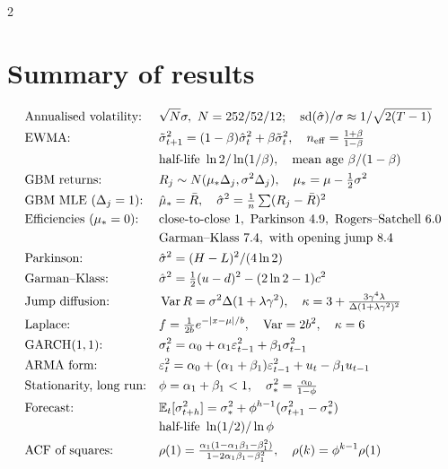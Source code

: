 \begin{paracol}{2}
\section*{Summary of results}
\begin{keyformulas}
\begin{align*}
&\text{Annualised volatility:} && \sqrt N\sigma,\ N=252/52/12;\quad \operatorname{sd}(\hat\sigma)/\sigma\approx1/\sqrt{2(T-1)}\\
&\text{EWMA:} && \tilde\sigma^2_{t+1}=(1-\beta)\hat\sigma^2_t+\beta\tilde\sigma^2_t,\quad n_{\mathrm{eff}}=\tfrac{1+\beta}{1-\beta}\\
& && \text{half-life }\ln2/\ln(1/\beta),\quad\text{mean age }\beta/(1-\beta)\\
&\text{GBM returns:} && R_j\sim N(\mu_*\Delta_j,\sigma^2\Delta_j),\quad \mu_*=\mu-\tfrac12\sigma^2\\
&\text{GBM MLE ($\Delta_j=1$):} && \hat\mu_*=\bar R,\quad \hat\sigma^2=\tfrac1n\textstyle\sum(R_j-\bar R)^2\\
&\text{Efficiencies ($\mu_*=0$):} && \text{close-to-close }1,\ \text{Parkinson }4.9,\ \text{Rogers--Satchell }6.0\\
& && \text{Garman--Klass }7.4,\ \text{with opening jump }8.4\\
&\text{Parkinson:} && \hat\sigma^2=(H-L)^2/(4\ln2)\\
&\text{Garman--Klass:} && \hat\sigma^2=\tfrac12(u-d)^2-(2\ln2-1)c^2\\
&\text{Jump diffusion:} && \Var R=\sigma^2\Delta(1+\lambda\gamma^2),\quad \kappa=3+\tfrac{3\gamma^4\lambda}{\Delta(1+\lambda\gamma^2)^2}\\
&\text{Laplace:} && f=\tfrac1{2b}e^{-|x-\mu|/b},\quad \Var=2b^2,\quad \kappa=6\\
&\text{GARCH$(1,1)$:} && \sigma_t^2=\alpha_0+\alpha_1\varepsilon_{t-1}^2+\beta_1\sigma_{t-1}^2\\
&\text{ARMA form:} && \varepsilon_t^2=\alpha_0+(\alpha_1+\beta_1)\varepsilon_{t-1}^2+u_t-\beta_1u_{t-1}\\
&\text{Stationarity, long run:} && \phi=\alpha_1+\beta_1<1,\quad \sigma_*^2=\tfrac{\alpha_0}{1-\phi}\\
&\text{Forecast:} && \E_t[\sigma^2_{t+h}]=\sigma_*^2+\phi^{h-1}(\sigma^2_{t+1}-\sigma_*^2)\\
& && \text{half-life }\ln(1/2)/\ln\phi\\
&\text{ACF of squares:} && \rho(1)=\tfrac{\alpha_1(1-\alpha_1\beta_1-\beta_1^2)}{1-2\alpha_1\beta_1-\beta_1^2},\quad \rho(k)=\phi^{k-1}\rho(1)\\

\end{align*}
\end{keyformulas}
\end{paracol}
